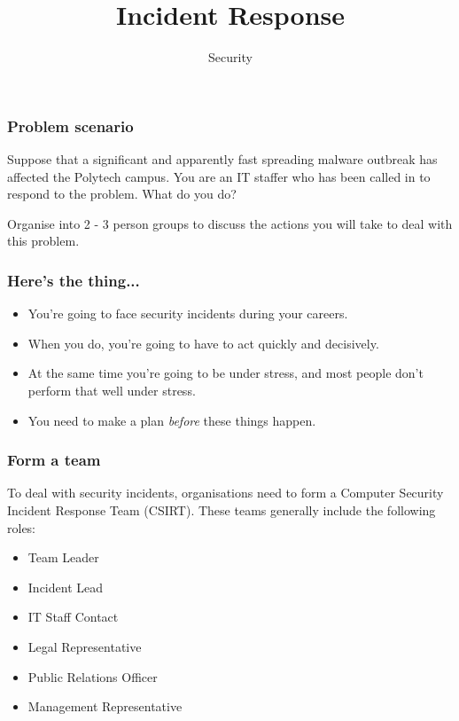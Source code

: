 \documentclass[10pt]{beamer}
\title{Incident Response}
\author[IN618]{Security}
\institute[Otago Polytechnic]{
  Otago Polytechnic \\
  Dunedin, New Zealand \\
}
\date{}
\begin{document}
\begin{frame}[plain]
  \titlepage
\end{frame}

\begin{frame}
	\frametitle{Problem scenario}
	
	Suppose that a significant and apparently fast spreading malware
	outbreak has affected the Polytech campus.  You are an IT staffer
	who has been called in to respond to the problem.  What do you do?
	
	\vspace{5mm}
	Organise into 2 - 3 person groups to discuss the actions you will
	take to deal with this problem.
\end{frame}





\begin{frame}
	\frametitle{Here's the thing...}
	
	\begin{itemize}
		\item You're going to face security incidents during your careers.
		\item When you do, you're going to have to act quickly and decisively.
		\item At the same time you're going to be under stress, and most people
		      don't perform that well under stress.
		\item You need to make a plan \emph{before} these things happen.
	\end{itemize}
\end{frame}

\begin{frame}
	\frametitle{Form a team}
	
	To deal with security incidents, organisations need to form a Computer Security
	Incident Response Team (CSIRT). These teams generally include the following roles:
	
	\begin{itemize}
		\item Team Leader
		\item Incident Lead
		\item IT Staff Contact
		\item Legal Representative
		\item Public Relations Officer
		\item Management Representative
	\end{itemize}
\end{frame}
\end{document}
